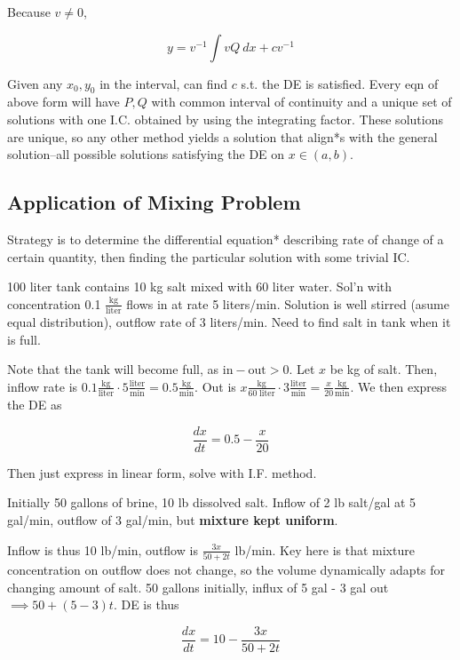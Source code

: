 Because $v\neq 0$,

\begin{equation*}
    y=v^{-1}\int vQ\: dx + cv^{-1}
\end{equation*}

Given any $x_0,y_0$ in the interval, can find $c$ s.t. the DE is satisfied.
Every eqn of above form will have $P,Q$ with common interval of continuity and a unique set of solutions with one I.C. obtained by using the integrating factor.
These solutions are unique, so any other method yields a solution that align*s with the general solution–all possible solutions satisfying the DE on $x\in (a,b)$.

\subsection{Application of Mixing Problem}

Strategy is to determine the differential equation* describing rate of change of a certain quantity, then finding the particular solution with some trivial IC.

\begin{example}
    100 liter tank contains 10 kg salt mixed with 60 liter water. Sol'n with concentration 0.1 $\frac{\mathrm{kg}}{\mathrm{liter}}$ flows in at rate 5 liters/min.
    Solution is well stirred (asume equal distribution), outflow rate of 3 liters/min. Need to find salt in tank when it is full.

    Note that the tank will become full, as $\mathrm{in}-\mathrm{out}>0$. Let $x$ be kg of salt.
    Then, inflow rate is $0.1 \frac{\mathrm{kg}}{\mathrm{liter}}\cdot 5\frac{\mathrm{liter}}{\mathrm{min}}=0.5\frac{\mathrm{kg}}{\mathrm{min}}$. Out is
    $x \frac{\mathrm{kg}}{60\;\mathrm{liter}}\cdot 3\frac{\mathrm{liter}}{\mathrm{min}}=\frac{x}{20}\frac{\mathrm{kg}}{\mathrm{min}}$. We then express the DE as

    \begin{equation*}
        \frac{dx}{dt}=0.5-\frac{x}{20}
    \end{equation*}

    Then just express in linear form, solve with I.F. method.
\end{example}

\begin{example}
    Initially 50 gallons of brine, 10 lb dissolved salt. Inflow of 2 lb salt/gal at 5 gal/min, outflow of 3 gal/min, but \textbf{mixture kept uniform}.

    Inflow is thus 10 lb/min, outflow is $\frac{3x}{50+2t}$ lb/min. Key here is that mixture concentration on outflow does not change, so the volume dynamically adapts for changing amount of salt.
    50 gallons initially, influx of 5 gal - 3 gal out $\implies 50+(5-3)t$.
    DE is thus

    \begin{equation*}
        \frac{dx}{dt}=10-\frac{3x}{50+2t}
    \end{equation*}
\end{example}

